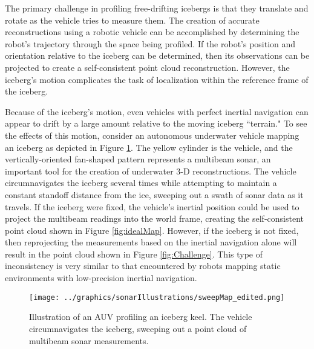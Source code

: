 The primary challenge in profiling free-drifting icebergs is that they translate and rotate as the vehicle tries to measure them. The creation of accurate reconstructions using a robotic vehicle can be accomplished by determining the robot's trajectory through the space being profiled. If the robot's position and orientation relative to the iceberg can be determined, then its observations can be projected to create a self-consistent point cloud reconstruction. However, the iceberg's motion complicates the task of localization within the reference frame of the iceberg.



Because of the iceberg's motion, even vehicles with perfect inertial navigation can appear to drift by a large amount relative to the moving iceberg ``terrain." To see the effects of this motion, consider an autonomous underwater vehicle mapping an iceberg as depicted in Figure \ref{fig:introSetup}. The yellow cylinder is the vehicle, and the vertically-oriented fan-shaped pattern represents a multibeam sonar, an important tool for the creation of underwater 3-D reconstructions. The vehicle circumnavigates the iceberg several times while attempting to maintain a constant standoff distance from the ice, sweeping out a swath of sonar data as it travels. If the iceberg were fixed, the vehicle's inertial position could be used to project the multibeam readings into the world frame, creating the self-consistent point cloud shown in Figure \ref{fig:idealMap}. However, if the iceberg is not fixed, then reprojecting the measurements based on the inertial navigation alone will result in the point cloud shown in Figure \ref{fig:Challenge}. This type of inconsistency is very similar to that encountered by robots mapping static environments with low-precision inertial navigation. 

\begin{figure}[!htb]
   \centering
   \texttt{[image: ../graphics/sonarIllustrations/sweepMap\_edited.png]} %
   \caption{Illustration of an AUV profiling an iceberg keel. The vehicle circumnavigates the iceberg, sweeping out a point cloud of multibeam sonar measurements. }
   \label{fig:introSetup}
\end{figure}

